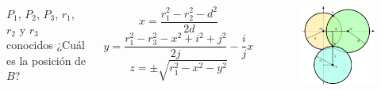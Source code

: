 \documentclass[mathserif]{beamer}
\begin{document}
\begin{frame}
\begin{columns}[t] %


$P_1$, $P_2$, $P_3$, $r_1$, $r_2$ y $r_3$ conocidos
¿Cuál es la posición de $B$?

\vspace*{.1\textwidth}

\begin{equation*}
x=\frac{r_1^2-r_2^2-d^2}{2d}
\end{equation*}
\begin{equation*}
y=\frac{r_1^2-r_3^2-x^2+i^2+j^2}{2j}-\frac{i}{j}x
\end{equation*}
\begin{equation*}
z=\pm\sqrt{r_1^2-x^2-y^2}
\end{equation*}

\begin{figure}
\includegraphics[width=\textwidth]{../figures_chesta/estado_del_arte/trilateration}
\end{figure}

\end{columns}

\end{frame}
\end{document}
